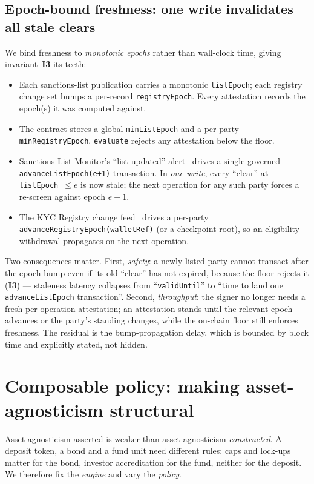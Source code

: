 \documentclass[11pt,a4paper]{article}
\newcommand{\Iref}[1]{\textbf{I#1}}
\begin{document}
\subsection{Epoch-bound freshness: one write invalidates all stale clears}
We bind freshness to \emph{monotonic epochs} rather than wall-clock time, giving
invariant~\Iref{3} its teeth:
\begin{itemize}[leftmargin=1.4em,itemsep=2pt]
  \item Each sanctions-list publication carries a monotonic \texttt{listEpoch};
  each registry change set bumps a per-record \texttt{registryEpoch}. Every
  attestation records the epoch(s) it was computed against.
  \item The contract stores a global \texttt{minListEpoch} and a per-party
  \texttt{minRegistryEpoch}. \texttt{evaluate} rejects any attestation below the
  floor.
  \item Sanctions List Monitor's ``list updated'' alert~\cite{swiftslm} drives a
  single governed \texttt{advanceListEpoch(e+1)} transaction. In \emph{one write},
  every ``clear'' at \texttt{listEpoch}~$\le e$ is now stale; the next operation
  for any such party forces a re-screen against epoch $e+1$.
  \item The KYC Registry change feed~\cite{swiftkycdata} drives a per-party
  \texttt{advanceRegistryEpoch(walletRef)} (or a checkpoint root), so an
  eligibility withdrawal propagates on the next operation.
\end{itemize}
Two consequences matter. First, \emph{safety}: a newly listed party cannot
transact after the epoch bump even if its old ``clear'' has not expired, because
the floor rejects it (\Iref{3}) --- staleness latency collapses from
``\texttt{validUntil}'' to ``time to land one \texttt{advanceListEpoch}
transaction''. Second, \emph{throughput}: the signer no longer needs a fresh
per-operation attestation; an attestation stands until the relevant epoch
advances or the party's standing changes, while the on-chain floor still enforces
freshness. The residual is the bump-propagation delay, which is bounded by block
time and explicitly stated, not hidden.

\section{Composable policy: making asset-agnosticism structural}
\label{sec:policy}

Asset-agnosticism asserted is weaker than asset-agnosticism \emph{constructed}. A
deposit token, a bond and a fund unit need different rules: caps and lock-ups
matter for the bond, investor accreditation for the fund, neither for the
deposit. We therefore fix the \emph{engine} and vary the \emph{policy}.
\end{document}
